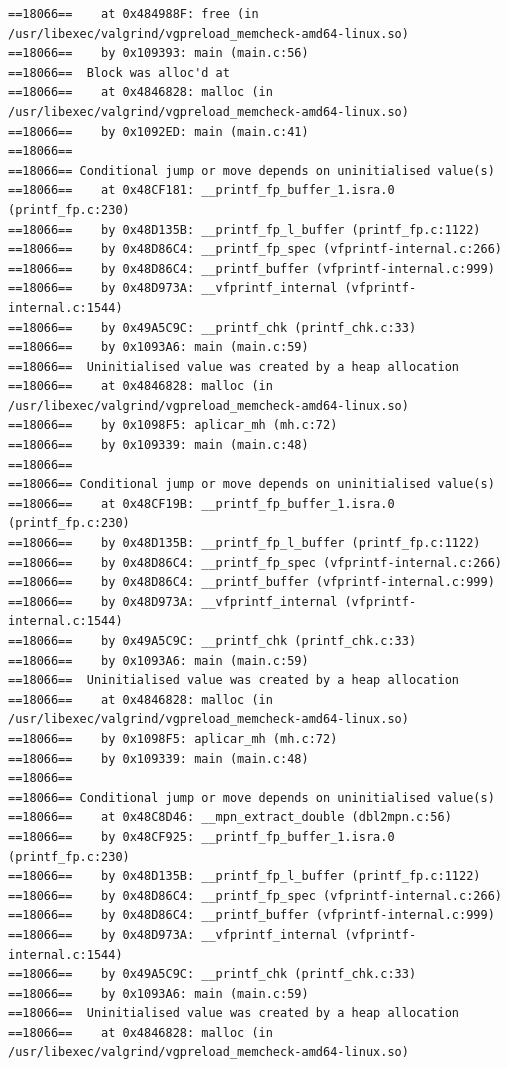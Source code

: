 \documentclass[12pt]{article}
\begin{document}
\begin{lstlisting}[style=EstiloValgrind]
==18066==    at 0x484988F: free (in /usr/libexec/valgrind/vgpreload_memcheck-amd64-linux.so)
==18066==    by 0x109393: main (main.c:56)
==18066==  Block was alloc'd at
==18066==    at 0x4846828: malloc (in /usr/libexec/valgrind/vgpreload_memcheck-amd64-linux.so)
==18066==    by 0x1092ED: main (main.c:41)
==18066== 
==18066== Conditional jump or move depends on uninitialised value(s)
==18066==    at 0x48CF181: __printf_fp_buffer_1.isra.0 (printf_fp.c:230)
==18066==    by 0x48D135B: __printf_fp_l_buffer (printf_fp.c:1122)
==18066==    by 0x48D86C4: __printf_fp_spec (vfprintf-internal.c:266)
==18066==    by 0x48D86C4: __printf_buffer (vfprintf-internal.c:999)
==18066==    by 0x48D973A: __vfprintf_internal (vfprintf-internal.c:1544)
==18066==    by 0x49A5C9C: __printf_chk (printf_chk.c:33)
==18066==    by 0x1093A6: main (main.c:59)
==18066==  Uninitialised value was created by a heap allocation
==18066==    at 0x4846828: malloc (in /usr/libexec/valgrind/vgpreload_memcheck-amd64-linux.so)
==18066==    by 0x1098F5: aplicar_mh (mh.c:72)
==18066==    by 0x109339: main (main.c:48)
==18066== 
==18066== Conditional jump or move depends on uninitialised value(s)
==18066==    at 0x48CF19B: __printf_fp_buffer_1.isra.0 (printf_fp.c:230)
==18066==    by 0x48D135B: __printf_fp_l_buffer (printf_fp.c:1122)
==18066==    by 0x48D86C4: __printf_fp_spec (vfprintf-internal.c:266)
==18066==    by 0x48D86C4: __printf_buffer (vfprintf-internal.c:999)
==18066==    by 0x48D973A: __vfprintf_internal (vfprintf-internal.c:1544)
==18066==    by 0x49A5C9C: __printf_chk (printf_chk.c:33)
==18066==    by 0x1093A6: main (main.c:59)
==18066==  Uninitialised value was created by a heap allocation
==18066==    at 0x4846828: malloc (in /usr/libexec/valgrind/vgpreload_memcheck-amd64-linux.so)
==18066==    by 0x1098F5: aplicar_mh (mh.c:72)
==18066==    by 0x109339: main (main.c:48)
==18066== 
==18066== Conditional jump or move depends on uninitialised value(s)
==18066==    at 0x48C8D46: __mpn_extract_double (dbl2mpn.c:56)
==18066==    by 0x48CF925: __printf_fp_buffer_1.isra.0 (printf_fp.c:230)
==18066==    by 0x48D135B: __printf_fp_l_buffer (printf_fp.c:1122)
==18066==    by 0x48D86C4: __printf_fp_spec (vfprintf-internal.c:266)
==18066==    by 0x48D86C4: __printf_buffer (vfprintf-internal.c:999)
==18066==    by 0x48D973A: __vfprintf_internal (vfprintf-internal.c:1544)
==18066==    by 0x49A5C9C: __printf_chk (printf_chk.c:33)
==18066==    by 0x1093A6: main (main.c:59)
==18066==  Uninitialised value was created by a heap allocation
==18066==    at 0x4846828: malloc (in /usr/libexec/valgrind/vgpreload_memcheck-amd64-linux.so)

\end{lstlisting}
\end{document}

